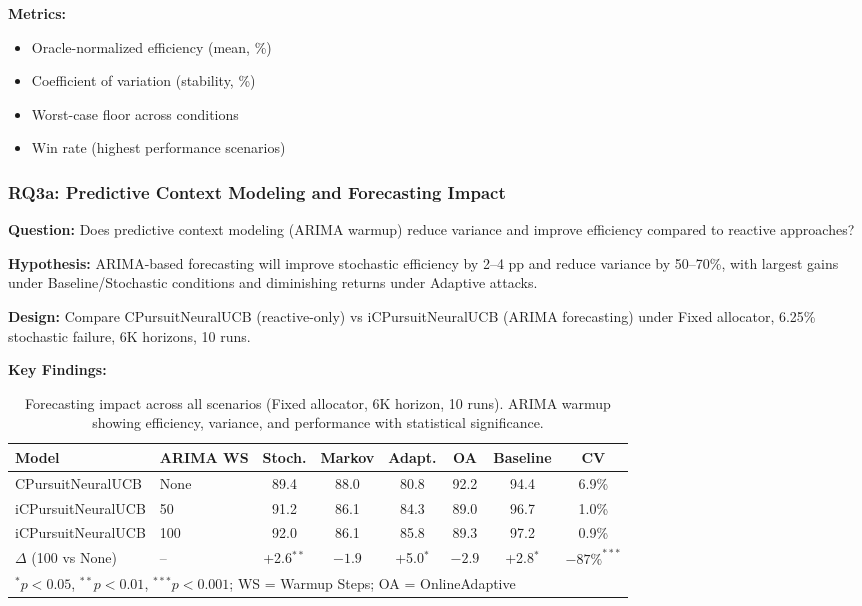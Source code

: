 \noindent\textbf{Metrics:}
\begin{itemize}[nosep]
\item Oracle-normalized efficiency (mean, \%)
\item Coefficient of variation (stability, \%)
\item Worst-case floor across conditions
\item Win rate (highest performance scenarios)
\end{itemize}


\subsubsection{RQ3a: Predictive Context Modeling and Forecasting Impact}

\noindent\textbf{Question:} Does predictive context modeling (ARIMA warmup) reduce variance and improve efficiency compared to reactive approaches?

\noindent\textbf{Hypothesis:} ARIMA-based forecasting will improve stochastic efficiency by 2--4 pp and reduce variance by 50--70\%, with largest gains under Baseline/Stochastic conditions and diminishing returns under Adaptive attacks.

\noindent\textbf{Design:} Compare CPursuitNeuralUCB (reactive-only) vs iCPursuitNeuralUCB (ARIMA forecasting) under Fixed allocator, 6.25\% stochastic failure, 6K horizons, 10 runs.

\noindent\textbf{Key Findings:}

\begin{table}[H]
\footnotesize
\centering
\caption{Forecasting impact across all scenarios (Fixed allocator, 6K horizon, 10 runs). ARIMA warmup showing efficiency, variance, and performance with statistical significance.}
\begin{tabular}{llcccccc}
\toprule
\textbf{Model} & \textbf{ARIMA WS} & \textbf{Stoch.} & \textbf{Markov} & \textbf{Adapt.} & \textbf{OA} & \textbf{Baseline} & \textbf{CV} \\
\midrule
CPursuitNeuralUCB & None & 89.4 & 88.0 & 80.8 & 92.2 & 94.4 & 6.9\% \\
iCPursuitNeuralUCB & 50 & 91.2 & 86.1 & 84.3 & 89.0 & 96.7 & 1.0\% \\
iCPursuitNeuralUCB & 100 & 92.0 & 86.1 & 85.8 & 89.3 & 97.2 & 0.9\% \\
\midrule
$\Delta$ (100 vs None) & -- & +2.6$^{**}$ & $-1.9$ & +5.0$^{*}$ & $-2.9$ & +2.8$^{*}$ & $-87\%^{***}$ \\
\bottomrule
\multicolumn{8}{l}{\scriptsize $^{*}p<0.05$, $^{**}p<0.01$, $^{***}p<0.001$; WS = Warmup Steps; OA = OnlineAdaptive} \\
\end{tabular}
\label{tab:rq3a_forecasting}
\end{table}

